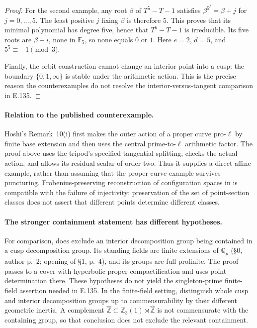 \begin{proof}
For the second example, any root \(\beta\) of
\(T^5-T-1\) satisfies
\(\beta^{5^j}=\beta+j\) for \(j=0,\ldots,5\).
The least positive \(j\) fixing \(\beta\) is therefore \(5\).
This proves that its minimal polynomial has degree five, hence that
\(T^5-T-1\) is irreducible.  Its five roots are \(\beta+i\),
none in \(\mathbb F_5\), so none equals \(0\) or \(1\).
Here \(e=2\), \(d=5\), and \(5^5\equiv-1\pmod3\).

Finally, the orbit construction cannot change an interior point into
a cusp: the boundary \(\{0,1,\infty\}\) is stable under the
arithmetic action.  This is the precise reason the counterexamples do
not resolve the interior-versus-tangent comparison in E.135.
\end{proof}

\paragraph{Relation to the published counterexample.}
Hoshi's Remark~10(i) first makes the outer action of a proper curve
pro-\(\ell\) by finite base extension and then uses the central
prime-to-\(\ell\) arithmetic factor.  The proof above uses the
tripod's specified tangential splitting, checks the actual action, and
allows its residual scalar of order two.  Thus it supplies a direct
affine example, rather than assuming that the proper-curve example
survives puncturing.  Frobenius-preserving reconstruction of configuration
spaces in \citet[Theorem~0.1, pp.~662--663; Proposition~2.5(ii),
pp.~696--697]{LitHoshi2009Configurations} is compatible with the failure
of injectivity: preservation of the set of point-section classes does
not assert that different points determine different classes.

\paragraph{The stronger containment statement has different hypotheses.}
For comparison, \citet[Theorem~1.3(iv), author p.~6]{LitMochizuki2005Sections}
does exclude an interior decomposition group being contained in a cusp
decomposition group.  Its standing fields are finite extensions of
\(\mathbb Q_p\) (\S0, author p.~2; opening of \S1, p.~4), and its
groups are full profinite.  The proof passes to a cover with hyperbolic
proper compactification and uses point determination there.  These
hypotheses do not yield the singleton-prime finite-field assertion
needed in E.135.  In the finite-field setting,
\citet[Proposition~1.8(ii), pp.~144--145]{AuditSaidiTamagawa2009}
distinguish whole cusp and interior decomposition groups up to
commensurability by their different geometric inertia.  A complement
\(\widehat{\mathbb Z}\subset\mathbb Z_3(1)\rtimes\widehat{\mathbb Z}\)
is not commensurate with the containing group, so that conclusion does
not exclude the relevant containment.
